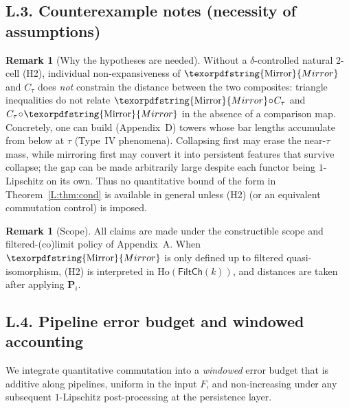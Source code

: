 \documentclass[11pt]{article}
\DeclareRobustCommand{\hyp}{\nobreakdash-}
\newcommand{\Ho}{\mathrm{Ho}}
\numberwithin{equation}{section}
\theoremstyle{definition}
\newtheorem{remark}[theorem]{Remark}
\DeclareRobustCommand{\Mirror}{\texorpdfstring{\ensuremath{\operatorname{Mirror}}}{Mirror}}
\begin{document}
\subsection*{L.3. Counterexample notes (necessity of assumptions)}
\begin{remark}[Why the hypotheses are needed]
Without a \(\delta\)-controlled natural \(2\)-cell (H2), individual non-expansiveness of \(\Mirror\) and \(C_\tau\) does \emph{not} constrain the distance between the two composites:
triangle inequalities do not relate \( \Mirror\!\circ\! C_\tau \) and \( C_\tau\!\circ\!\Mirror\) in the absence of a comparison map.
Concretely, one can build (Appendix~D) towers whose bar lengths accumulate from below at \(\tau\) (Type~IV phenomena).
Collapsing first may erase the near-\(\tau\) mass, while mirroring first may convert it into persistent features that survive collapse; the gap can be made arbitrarily large despite each functor being \(1\)-Lipschitz on its own.
Thus no quantitative bound of the form in Theorem~\ref{L:thm:cond} is available in general unless (H2) (or an equivalent commutation control) is imposed.
\end{remark}

\begin{remark}[Scope]
All claims are made under the constructible scope and filtered-(co)limit policy of Appendix~A.
When \(\Mirror\) is only defined up to filtered quasi-isomorphism, (H2) is interpreted in \(\Ho(\mathsf{FiltCh}(k))\), and distances are taken after applying \(\mathbf{P}_i\).
\end{remark}

\subsection*{L.4. Pipeline error budget and windowed accounting}
We integrate quantitative commutation into a \emph{windowed} error budget that is additive along pipelines, uniform in the input \(F\), and non-increasing under any subsequent \(1\)\hyp Lipschitz post\hyp processing at the persistence layer.
\end{document}
